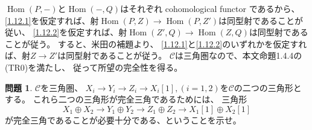 \documentclass[uplatex,dvipdfmx]{jsarticle}
\makeatletter
\theoremstyle{definition}
\newtheorem{prob}[prob]{問題}
\renewenvironment{proof}[1][\proofname]{
  \pushQED{\qed}%
  \normalfont \topsep6\p@\@plus6\p@\relax
  \trivlist
  \item[\hskip\labelsep
    #1\@addpunct{\textbf{.}}]\ignorespaces
}{%
  \popQED\endtrivlist\@endpefalse
}
\providecommand{\proofname}{証明}
\DeclareMathOperator{\Hom}{\mathrm{Hom}}
\newcommand\mcC{\mathcal{C}}
\makeatother
\begin{document}
\begin{proof}
  \(\Hom(P,-)\)と\(\Hom(-,Q)\)はそれぞれ cohomological functor であるから、
  \ref{1.12.1}を仮定すれば、射\(\Hom(P,Z) \to \Hom(P,Z')\)は同型射であることが従い、
  \ref{1.12.2}を仮定すれば、射\(\Hom(Z',Q) \to \Hom(Z,Q)\)は同型射であることが従う。
  すると、米田の補題より、
  \ref{1.12.1}と\ref{1.12.2}のいずれかを仮定すれば、射\(Z\to Z'\)は同型射であることが従う。
  \(\mcC\)は三角圏なので、本文命題1.4.4の(TR0)を満たし、
  従って所望の完全性を得る。
\end{proof}







\begin{prob}\label{1.13}
  \(\mcC\)を三角圏、
  \(X_i\to Y_i\to Z_i\to X_i[1], (i=1,2)\)を\(\mcC\)の二つの三角形とする。
  これら二つの三角形が完全三角であるためには、
  三角形
  \[X_1\oplus X_2 \to Y_1\oplus Y_2 \to Z_1\oplus Z_2 \to X_1[1]\oplus X_2[1]\]
  が完全三角であることが必要十分である、ということを示せ。
\end{prob}
\end{document}
